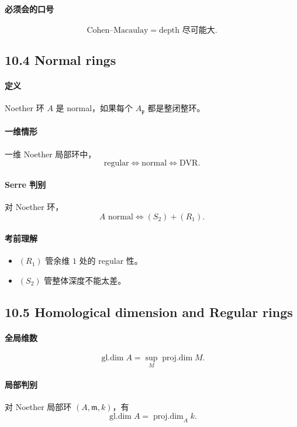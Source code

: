 \documentclass[a4paper]{ctexart}
\begin{document}
\paragraph{必须会的口号}
\[
\text{Cohen--Macaulay}=\text{depth 尽可能大}.
\]

\subsection{10.4 Normal rings}

\paragraph{定义}
Noether 环 \(A\) 是 normal，如果每个 \(A_{\mathfrak p}\) 都是整闭整环。

\paragraph{一维情形}
一维 Noether 局部环中，
\[
\text{regular}
\Longleftrightarrow
\text{normal}
\Longleftrightarrow
\text{DVR}.
\]

\paragraph{Serre 判别}
对 Noether 环，
\[
A \text{ normal}
\Longleftrightarrow
(S_2)+(R_1).
\]

\paragraph{考前理解}
\begin{itemize}
  \item \((R_1)\) 管余维 \(1\) 处的 regular 性。
  \item \((S_2)\) 管整体深度不能太差。
\end{itemize}

\subsection{10.5 Homological dimension and Regular rings}

\paragraph{全局维数}
\[
\operatorname{gl.dim}A=\sup_M \operatorname{proj.dim}M.
\]

\paragraph{局部判别}
对 Noether 局部环 \((A,\mathfrak m,k)\)，有
\[
\operatorname{gl.dim}A=\operatorname{proj.dim}_A k.
\]
\end{document}
